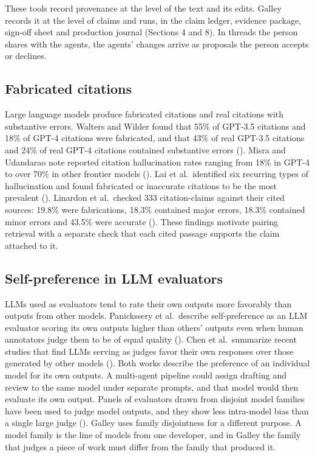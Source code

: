 \documentclass[
]{article}
\begin{document}
These tools record provenance at the level of the text and its edits.
Galley records it at the level of claims and runs, in the claim ledger,
evidence package, sign-off sheet and production journal (Sections 4 and
8). In threads the person shares with the agents, the agents' changes
arrive as proposals the person accepts or declines.

\subsection{Fabricated citations}\label{fabricated-citations}

Large language models produce fabricated citations and real citations
with substantive errors. Walters and Wilder found that 55\% of GPT-3.5
citations and 18\% of GPT-4 citations were fabricated, and that 43\% of
real GPT-3.5 citations and 24\% of real GPT-4 citations contained
substantive errors (). Misra and Udandarao note reported citation hallucination
rates ranging from 18\% in GPT-4 to over 70\% in other frontier models
(). Lai et
al.~identified six recurring types of hallucination and found fabricated
or inaccurate citations to be the most prevalent
(). Linardon et
al.~checked 333 citation-claims against their cited sources: 19.8\% were
fabrications, 18.3\% contained major errors, 18.3\% contained minor
errors and 43.5\% were accurate
(). These
findings motivate pairing retrieval with a separate check that each
cited passage supports the claim attached to it.

\subsection{Self-preference in LLM
evaluators}\label{self-preference-in-llm-evaluators}

LLMs used as evaluators tend to rate their own outputs more favorably
than outputs from other models. Panickssery et al.~describe
self-preference as an LLM evaluator scoring its own outputs higher than
others' outputs even when human annotators judge them to be of equal
quality ().
Chen et al.~summarize recent studies that find LLMs serving as judges
favor their own responses over those generated by other models
(). Both works describe
the preference of an individual model for its own outputs. A multi-agent
pipeline could assign drafting and review to the same model under
separate prompts, and that model would then evaluate its own output.
Panels of evaluators drawn from disjoint model families have been used
to judge model outputs, and they show less intra-model bias than a
single large judge (). Galley uses family disjointness for a different purpose. A model
family is the line of models from one developer, and in Galley the
family that judges a piece of work must differ from the family that
produced it.
\end{document}
